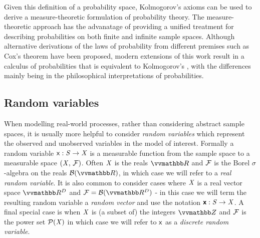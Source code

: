 Given this definition of a probability space, Kolmogorov's axioms \citep{} can be used to derive a measure-theoretic formulation of probability theory. The measure-theoretic approach has the advanatage of providing a unified treatment for describing probabilities on both finite and infinite sample spaces. Although alternative derivations of the laws of probability from different premises such as Cox's theorem \citep{} have been proposed, modern extensions of this work result in a calculus of probabilities that is equivalent to Kolmogorov's \citep{}, with the differences mainly being in the philosophical interpretations of probabilities.

\subsection{Random variables}\label{subsec:random-variables}

When modelling real-world processes, rather than considering abstract sample spaces, it is usually more helpful to consider \emph{random variables} which represent the observed and unobserved variables in the model of interest. Formally a random variable $\mathsf{x} : \mathit{S} \to \mathit{X}$ is a measurable function from the sample space to a measurable space $(\mathit{X},\,\mathcal{F})$. Often $\mathit{X}$ is the reals $\reals$ and $\mathcal{F}$ is the Borel $\sigma$-algebra on the reals $\sset{B}(\reals)$, in which case we will refer to a \emph{real random variable}. It is also common to consider cases where $\mathit{X}$ is a real vector space $\reals^D$ and $\sset{F} = \sset{B}(\reals^D)$ - in this case we will term the resulting random variable a \emph{random vector} and use the notation $\boldsymbol{\mathsf{x}} : \mathit{S} \to \mathit{X}$. A final special case is when $\mathit{X}$ is (a subset of) the integers $\integers$ and $\mathcal{F}$ is the power set $\mathcal{P}(\mathit{X})$ in which case we will refer to $\mathsf{x}$ as a \emph{discrete random variable}.

